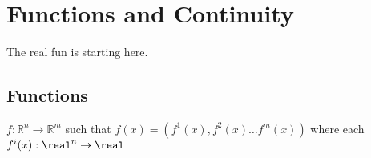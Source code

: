 \chapter{Functions and Continuity}
The real fun is starting here.
\section{Functions}
$f:\mathbb{R}^n\rightarrow \mathbb{R}^m$ such that $f(x)=(f^1(x),f^2(x) \dots f^m(x))$ where each $f^i(x):\real^n \rightarrow \real$ 